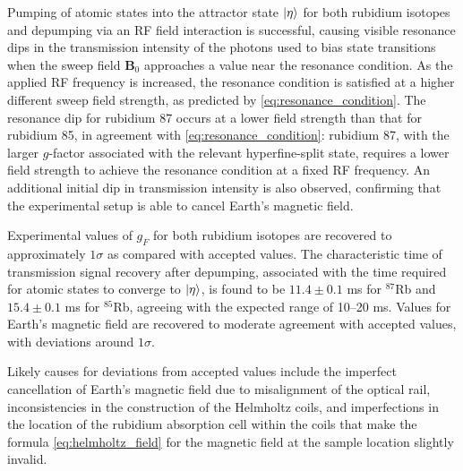 \documentclass[11pt]{article}
\begin{document}
Pumping of atomic states into the attractor state $\ket \eta$ for both
rubidium isotopes and depumping via an RF field interaction is
successful, causing visible resonance dips in the transmission
intensity of the photons used to bias state transitions when the
sweep field $\mathbf{B}_0$ approaches a value near the resonance
condition. As the applied RF frequency is increased, the resonance
condition is satisfied at a higher
different sweep field strength, as predicted by
\eqref{eq:resonance_condition}. The resonance
dip for rubidium 87 occurs at a lower field strength than that for rubidium 85,
in agreement with \eqref{eq:resonance_condition}:
rubidium 87, with the larger
$g$-factor associated with the relevant hyperfine-split state, requires a
lower field strength to achieve the resonance condition at a fixed RF
frequency. An additional initial dip in transmission intensity is also observed,
confirming that the experimental setup is able to cancel Earth's magnetic field.

Experimental values of $g_F$ for both rubidium isotopes are recovered
to approximately $1\sigma$ as compared with accepted values. The
characteristic time of transmission signal recovery after depumping,
associated with the time required for atomic states to
converge to $\ket{\eta}$, is found to be $11.4 \pm 0.1$ ms for $^{87}$Rb and
$15.4 \pm 0.1$ ms for $^{85}$Rb, agreeing with the expected range of
10--20 ms. Values for Earth's magnetic field are recovered to moderate agreement
with accepted values, with deviations around $1\sigma$.

Likely causes for deviations from accepted values include the
imperfect cancellation of Earth's magnetic field due to misalignment
of the optical rail, inconsistencies in the construction of the
Helmholtz coils, and imperfections in the location of the rubidium
absorption cell within the coils that make the formula
\eqref{eq:helmholtz_field} for the magnetic field at the sample location
slightly invalid.



\end{document}
